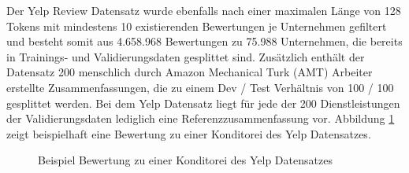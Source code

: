 Der Yelp Review Datensatz wurde ebenfalls nach einer maximalen Länge von 128 Tokens mit mindestens 10 existierenden Bewertungen je Unternehmen gefiltert und besteht somit aus 4.658.968 Bewertungen zu 75.988 Unternehmen, die bereits in Trainings- und Validierungsdaten gesplittet sind. 
Zusätzlich enthält der Datensatz 200 menschlich durch Amazon Mechanical Turk (AMT) Arbeiter erstellte Zusammenfassungen, die zu einem Dev / Test Verhältnis von 100 / 100 gesplittet werden. 
Bei dem Yelp Datensatz liegt für jede der 200 Dienstleistungen der Validierungsdaten lediglich eine Referenzzusammenfassung vor.
Abbildung \ref{yelp_review_example} zeigt beispielhaft eine Bewertung zu einer Konditorei des Yelp Datensatzes.

\begin{figure}[!h]
    \centering
    \scriptsize
    \caption{Beispiel Bewertung zu einer Konditorei des Yelp Datensatzes}
    \label{yelp_review_example}
\end{figure}
\pagebreak
